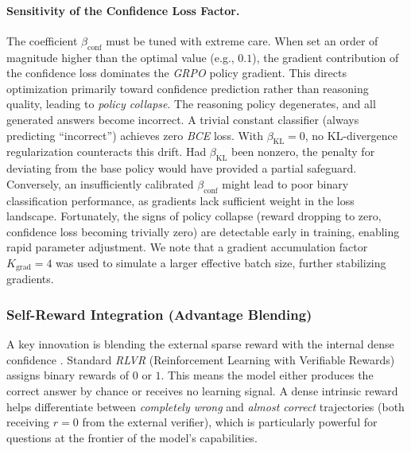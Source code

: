 \documentclass[a4paper,oneside,10pt,ngerman,english]{scrartcl}
\begin{document}
\paragraph{Sensitivity of the Confidence Loss Factor.}
\label{sec:conf_loss_sensitivity}
The coefficient $\beta_{\mathrm{conf}}$ must be tuned with extreme care. When set an order of magnitude higher than the optimal value (e.g., $0.1$), the gradient contribution of the confidence loss dominates the \textit{GRPO} policy gradient. This directs optimization primarily toward confidence prediction rather than reasoning quality, leading to \textit{policy collapse}. The reasoning policy degenerates, and all generated answers become incorrect. A trivial constant classifier (always predicting ``incorrect'') achieves zero \textit{BCE} loss. With $\beta_{\mathrm{KL}} = 0$, no KL-divergence regularization counteracts this drift. Had $\beta_{\mathrm{KL}}$ been nonzero, the penalty for deviating from the base policy would have provided a partial safeguard. Conversely, an insufficiently calibrated $\beta_{\mathrm{conf}}$ might lead to poor binary classification performance, as gradients lack sufficient weight in the loss landscape. Fortunately, the signs of policy collapse (reward dropping to zero, confidence loss becoming trivially zero) are detectable early in training, enabling rapid parameter adjustment. We note that a gradient accumulation factor $K_{\mathrm{grad}} = 4$ was used to simulate a larger effective batch size, further stabilizing gradients.

\subsubsection{Self-Reward Integration (Advantage Blending)}
\label{sec:advantage_blending}
A key innovation is blending the external sparse reward with the internal dense confidence \citep{laser}. Standard \textit{RLVR} (Reinforcement Learning with Verifiable Rewards) assigns binary rewards of $0$ or $1$. This means the model either produces the correct answer by chance or receives no learning signal. A dense intrinsic reward helps differentiate between \textit{completely wrong} and \textit{almost correct} trajectories (both receiving $r=0$ from the external verifier), which is particularly powerful for questions at the frontier of the model's capabilities.
\end{document}
